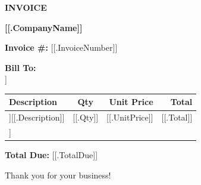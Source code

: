 \documentclass{article}
\begin{document}
\begin{center}
{\Large \textbf{INVOICE}}
\end{center}

\vspace{1em}

\noindent
\textbf{[[.CompanyName]]}

\vspace{2em}

\noindent
\textbf{Invoice \#:} [[.InvoiceNumber]]

\vspace{1em}

\noindent
\textbf{Bill To:} \\
[[.ClientName]]

\vspace{2em}

\begin{tabular}{|p{6cm}|c|r|r|}
\hline
\textbf{Description} & \textbf{Qty} & \textbf{Unit Price} & \textbf{Total} \\
\hline
[[range .Items]][[.Description]] & [[.Qty]] & [[.UnitPrice]] & [[.Total]] \\
\hline
[[end]]\end{tabular}

\vspace{1em}

\noindent
\textbf{Total Due:} [[.TotalDue]]

\vspace{2em}

\noindent
Thank you for your business!
\end{document}
